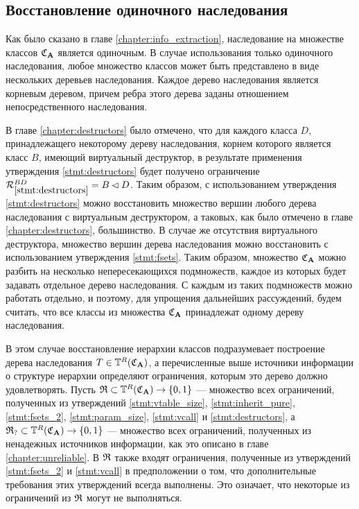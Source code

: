 \subsection{Восстановление одиночного наследования}\label{chapter:full_sing_inhr_rec}
Как было сказано в главе \ref{chapter:info_extraction}, наследование на множестве классов $\mathfrak{C}_{\mathbf{A}}$ является одиночным. В случае использования только одиночного наследования, любое множество классов может быть представлено в виде нескольких деревьев наследования. Каждое дерево наследования является корневым деревом, причем ребра этого дерева заданы отношением непосредственного наследования.

В главе \ref{chapter:destructors} было отмечено, что для каждого класса $D$, принадлежащего некоторому дереву наследования, корнем которого является класс $B$, имеющий виртуальный деструктор, в результате применения утверждения \ref{stmt:destructors} будет получено ограничение $\mathcal{R}_{\ref{stmt:destructors}}^{BD} = B \lhd D$. Таким образом, с использованием утверждения \ref{stmt:destructors} можно восстановить множество вершин любого дерева наследования с виртуальным деструктором, а таковых, как было отмечено в главе \ref{chapter:destructors}, большинство. В случае же отсутствия виртуального деструктора, множество вершин дерева наследования можно восстановить с использованием утверждения \ref{stmt:fsets}. Таким образом, множество $\mathfrak{C}_{\mathbf{A}}$ можно разбить на несколько непересекающихся подмножеств, каждое из которых будет задавать отдельное дерево наследования. С каждым из таких подмножеств можно работать отдельно, и поэтому, для упрощения дальнейших рассуждений, будем считать, что все классы из множества $\mathfrak{C}_{\mathbf{A}}$ принадлежат одному дереву наследования.

В этом случае восстановление иерархии классов подразумевает построение дерева наследования $T \in \mathbb{T}^R(\mathfrak{C}_{\mathbf{A}})$, а перечисленные выше источники информации о структуре иерархии определяют ограничения, которым это дерево должно удовлетворять. Пусть $\mathfrak{R} \subset \mathbb{T}^R(\mathfrak{C}_{\mathbf{A}}) \rightarrow \{0, 1\}$ --- множество всех ограничений, полученных из утверждений \ref{stmt:vtable_size}, \ref{stmt:inherit_pure}, \ref{stmt:fsets_2}, \ref{stmt:param_size}, \ref{stmt:vcall} и \ref{stmt:destructors}, а $\mathfrak{R}_? \subset \mathbb{T}^R(\mathfrak{C}_{\mathbf{A}}) \rightarrow \{0, 1\}$ --- множество всех ограничений, полученных из ненадежных источников информации, как это описано в главе \ref{chapter:unreliable}. В $\mathfrak{R}$ также входят ограничения, полученные из утверждений \ref{stmt:fsets_2} и \ref{stmt:vcall} в предположении о том, что дополнительные требования этих утверждений всегда выполнены. Это означает, что некоторые из ограничений из $\mathfrak{R}$ могут не выполняться.

